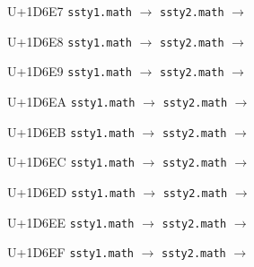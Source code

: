 \documentclass{article}
\begin{document}
\begin{substitutions}
\goodbreak

U+1D6E7  \linebreak
    \texttt{ssty1.math} $\to$  \linebreak
    \texttt{ssty2.math} $\to$  

\goodbreak

U+1D6E8  \linebreak
    \texttt{ssty1.math} $\to$  \linebreak
    \texttt{ssty2.math} $\to$  

\goodbreak

U+1D6E9  \linebreak
    \texttt{ssty1.math} $\to$  \linebreak
    \texttt{ssty2.math} $\to$  

\goodbreak

U+1D6EA  \linebreak
    \texttt{ssty1.math} $\to$  \linebreak
    \texttt{ssty2.math} $\to$  

\goodbreak

U+1D6EB  \linebreak
    \texttt{ssty1.math} $\to$  \linebreak
    \texttt{ssty2.math} $\to$  

\goodbreak

U+1D6EC  \linebreak
    \texttt{ssty1.math} $\to$  \linebreak
    \texttt{ssty2.math} $\to$  

\goodbreak

U+1D6ED  \linebreak
    \texttt{ssty1.math} $\to$  \linebreak
    \texttt{ssty2.math} $\to$  

\goodbreak

U+1D6EE  \linebreak
    \texttt{ssty1.math} $\to$  \linebreak
    \texttt{ssty2.math} $\to$  

\goodbreak

U+1D6EF  \linebreak
    \texttt{ssty1.math} $\to$  \linebreak
    \texttt{ssty2.math} $\to$  


\end{substitutions}
\end{document}
